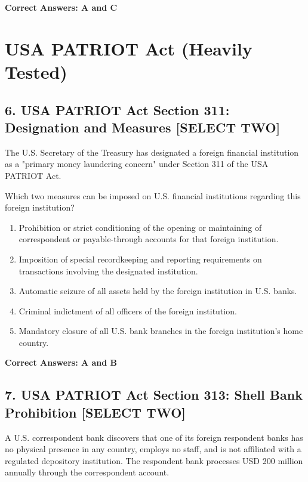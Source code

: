 \documentclass[11pt,a4paper]{article}
\begin{document}
	\textbf{Correct Answers: A and C}
	
	\section{USA PATRIOT Act (Heavily Tested)}
	
	\subsection{6. USA PATRIOT Act Section 311: Designation and Measures \textnormal{[SELECT TWO]}}
	
	The U.S. Secretary of the Treasury has designated a foreign financial institution as a "primary money laundering concern" under Section 311 of the USA PATRIOT Act.
	
	Which two measures can be imposed on U.S. financial institutions regarding this foreign institution?
	
	\begin{enumerate}[label=\Alph*.]
		\item Prohibition or strict conditioning of the opening or maintaining of correspondent or payable-through accounts for that foreign institution.
		\item Imposition of special recordkeeping and reporting requirements on transactions involving the designated institution.
		\item Automatic seizure of all assets held by the foreign institution in U.S. banks.
		\item Criminal indictment of all officers of the foreign institution.
		\item Mandatory closure of all U.S. bank branches in the foreign institution's home country.
	\end{enumerate}
	
	\textbf{Correct Answers: A and B}
	
	\subsection{7. USA PATRIOT Act Section 313: Shell Bank Prohibition \textnormal{[SELECT TWO]}}
	
	A U.S. correspondent bank discovers that one of its foreign respondent banks has no physical presence in any country, employs no staff, and is not affiliated with a regulated depository institution. The respondent bank processes USD 200 million annually through the correspondent account.
	
\end{document}
